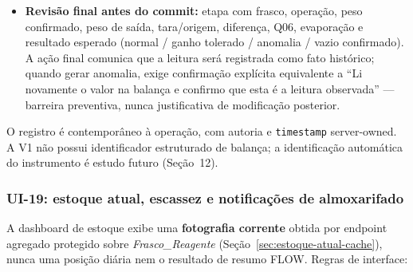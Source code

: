 \begin{itemize}
    \item \textbf{Revisão final antes do commit:} etapa com frasco, operação, peso confirmado, peso de saída, tara/origem, diferença, Q06, evaporação e resultado esperado (normal / ganho tolerado / anomalia / vazio confirmado). A ação final comunica que a leitura será registrada como fato histórico; quando gerar anomalia, exige confirmação explícita equivalente a ``Li novamente o valor na balança e confirmo que esta é a leitura observada'' — barreira preventiva, nunca justificativa de modificação posterior.
\end{itemize}
O registro é contemporâneo à operação, com autoria e \texttt{timestamp} server-owned. A V1 não possui identificador estruturado de balança; a identificação automática do instrumento é estudo futuro (Seção~12).

\subsubsection{UI-19: estoque atual, escassez e notificações de almoxarifado}
A dashboard de estoque exibe uma \textbf{fotografia corrente} obtida por endpoint agregado protegido sobre \textit{Frasco\_Reagente} (Seção~\ref{sec:estoque-atual-cache}), nunca uma posição diária nem o resultado de resumo FLOW. Regras de interface:
